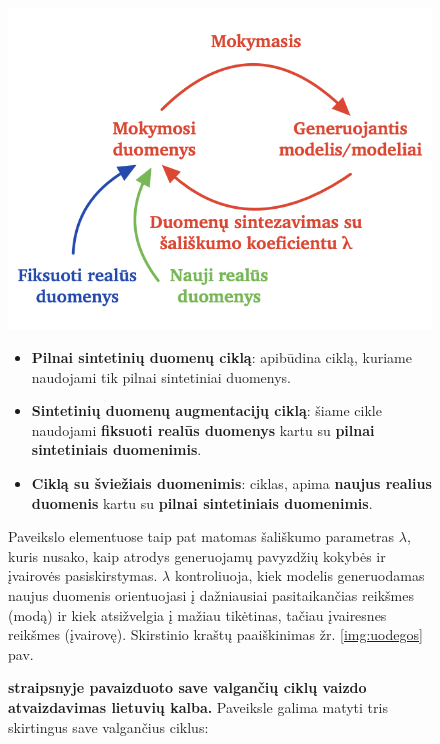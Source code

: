 \documentclass{VUMIFInfKursinis}
\begin{document}
\begin{figure}[H]
    \centering
    \includegraphics[scale=0.7]{img/valgantysCiklai.png}
    \caption{
        \textbf{\cite{ModelsGoMAD} straipsnyje pavaizduoto save valgančių ciklų vaizdo atvaizdavimas lietuvių kalba.} Paveiksle galima matyti tris skirtingus save valgančius ciklus:
    }
    \label{img:ciklai}
    
    \begin{itemize}
        \item \textbf{\textcolor{raudona}{Pilnai sintetinių duomenų ciklą}}: apibūdina ciklą, kuriame naudojami tik pilnai sintetiniai duomenys.
        \item \textbf{Sintetinių duomenų augmentacijų ciklą}: šiame cikle naudojami \textbf{\textcolor{melyna}{fiksuoti realūs duomenys}} kartu su \textbf{\textcolor{raudona}{pilnai sintetiniais duomenimis}}.
        \item \textbf{Ciklą su šviežiais duomenimis}: ciklas, apima \textbf{\textcolor{zalia}{naujus realius duomenis}} kartu su \textbf{\textcolor{raudona}{pilnai sintetiniais duomenimis}}.
    \end{itemize}

    Paveikslo elementuose taip pat matomas šališkumo parametras \textbf{\textcolor{raudona}{\(\lambda\)}}, kuris nusako, kaip atrodys generuojamų pavyzdžių kokybės ir įvairovės pasiskirstymas. \textbf{\textcolor{raudona}{\( \lambda \)}} kontroliuoja, kiek modelis generuodamas naujus duomenis orientuojasi į dažniausiai pasitaikančias reikšmes (modą) ir kiek atsižvelgia į mažiau tikėtinas, tačiau įvairesnes reikšmes (įvairovę). Skirstinio kraštų paaiškinimas žr. \ref{img:uodegos} pav.


\end{figure}
\end{document}
